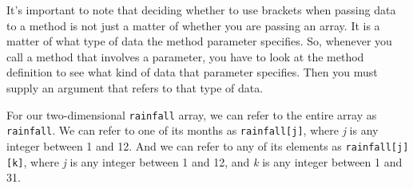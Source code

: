 It's important to note that deciding whether to use brackets when
passing data to a method is not just a matter of whether you are
passing an array.  It is a matter of what type of data the method
parameter specifies.   So, whenever you call a method that involves a
parameter, you have to look at the method definition to see what kind
of data that parameter specifies.  Then you must supply an argument
that refers to that type of data.

For our two-dimensional {\tt rainfall} array, we can refer to the
entire array as {\tt rainfall}. We can refer to one of its months as
{\tt rainfall[j]}, where {\it j} is any integer between 1 and 12. And
we can refer to any of its elements as {\tt rainfall[j][k]}, where
{\it j} is any integer between 1 and 12, and {\it k} is any integer
between 1 and 31.



